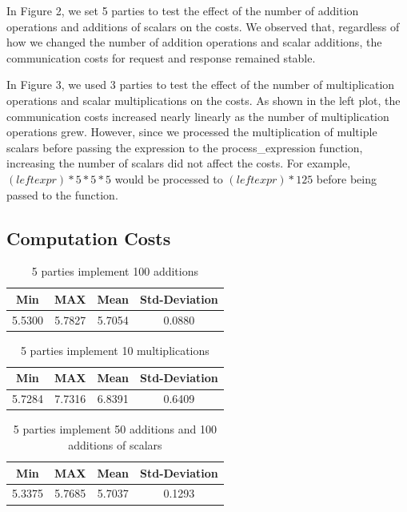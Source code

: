 \documentclass[10pt,conference,compsocconf]{IEEEtran}
\begin{document}
In Figure 2, we set 5 parties to test the effect of the number of addition operations and additions of scalars on the costs. We observed that, regardless of how we changed the number of addition operations and scalar additions, the communication costs for request and response remained stable.

In Figure 3, we used 3 parties to test the effect of the number of multiplication operations and scalar multiplications on the costs. As shown in the left plot, the communication costs increased nearly linearly as the number of multiplication operations grew. However, since we processed the multiplication of multiple scalars before passing the expression to the process\_expression function, increasing the number of scalars did not affect the costs. For example, $(left expr) * 5 * 5 * 5$ would be processed to $(left expr) * 125$ before being passed to the function.

\subsection{Computation Costs}

\begin {table}[H]
\caption {5 parties implement 100 additions} \label{tab:title} 
\begin{center}
\begin{tabular}{||c c c c||} 
 \hline
 Min & MAX & Mean & Std-Deviation \\ [0.5ex] 
 \hline\hline
 5.5300 & 5.7827 & 5.7054 & 0.0880 \\ [1ex] 
 \hline
\end{tabular}
\end{center}
\end {table}

\begin {table}[H]
\caption {5 parties implement 10 multiplications} \label{tab:title} 
\begin{center}
\begin{tabular}{||c c c c||} 
 \hline
 Min & MAX & Mean & Std-Deviation \\ [0.5ex] 
 \hline\hline
 5.7284 & 7.7316 & 6.8391 & 0.6409 \\ [1ex] 
 \hline
\end{tabular}
\end{center}
\end {table}

\begin {table}[H]
\caption {5 parties implement 50 additions and 100 additions of scalars} \label{tab:title} 
\begin{center}
\begin{tabular}{||c c c c||} 
 \hline
 Min & MAX & Mean & Std-Deviation \\ [0.5ex] 
 \hline\hline
 5.3375 & 5.7685 & 5.7037 & 0.1293 \\ [1ex] 
 \hline
\end{tabular}
\end{center}
\end {table}
\end{document}

